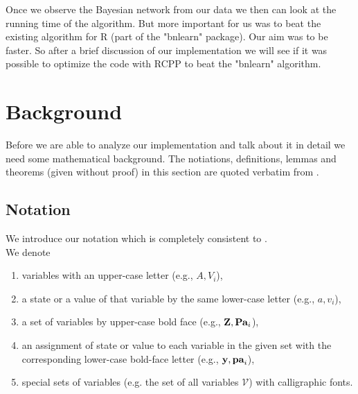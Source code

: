 
Once we observe the Bayesian network from our data we then can look at the running time of the algorithm. But more important for us was to beat the existing algorithm for R (part of the "bnlearn" package). Our aim was to be faster. So after a brief discussion of our implementation we will see if it was possible to optimize the code with RCPP to beat the "bnlearn" algorithm.

\chapter{Background}

	Before we are able to analyze our implementation and talk about it in detail we need some mathematical background. The notiations, definitions, lemmas and theorems (given without proof) in this section are quoted verbatim from \cite{TBA}.

	\section*{Notation}

		We introduce our notation which is completely consistent to \cite{TBA}.\\
		We denote
		\begin{enumerate}
			\item variables with an upper-case letter (e.g., $A, V_{i}$),
			\item a state or a value of that variable by the same lower-case letter (e.g., $a, v_{i}$),
			\item a set of variables by upper-case bold face (e.g., ${\textbf{Z}}, {\textbf{Pa}}_{i}$),
			\item an assignment of state or value to each variable in the given set with the corresponding lower-case bold-face letter (e.g., ${\textbf{y}}, {\textbf{pa}}_{i}$),
			\item special sets of variables (e.g. the set of all variables $\mathcal{V}$) with calligraphic fonts.
		\end{enumerate}

